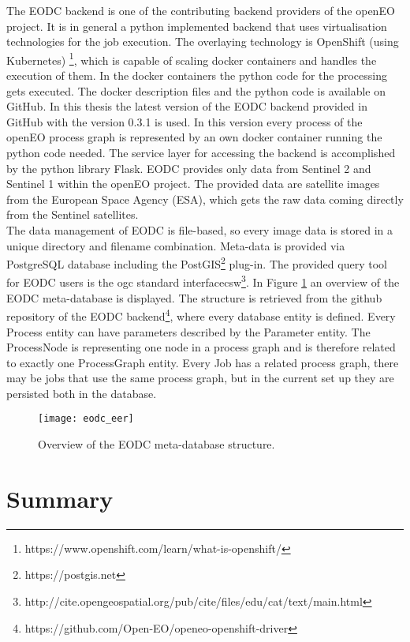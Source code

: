 \documentclass[draft,final]{vutinfth} %
\begin{document}
The EODC backend is one of the contributing backend providers of the openEO project. It is in general a python implemented backend that uses virtualisation technologies for the job execution. The overlaying technology is OpenShift (using Kubernetes) \footnote{https://www.openshift.com/learn/what-is-openshift/}, which is capable of scaling docker containers and handles the execution of them. In the docker containers the python code for the processing gets executed. The docker description files and the python code is available on GitHub. In this thesis the latest version of the EODC backend provided in GitHub with the version 0.3.1 is used. In this version every process of the openEO process graph is represented by an own docker container running the python code needed. The service layer for accessing the backend is accomplished by the python library Flask. EODC provides only data from Sentinel 2 and Sentinel 1 within the openEO project. The provided data are satellite images from the European Space Agency (ESA), which gets the raw data coming directly from the Sentinel satellites. \\
The data management of EODC is file-based, so every image data is stored in a unique directory and filename combination. Meta-data is provided via PostgreSQL database including the PostGIS\footnote{https://postgis.net} plug-in. The provided query tool for EODC users is the \gls{ogc} standard interface\gls{csw}\footnote{http://cite.opengeospatial.org/pub/cite/files/edu/cat/text/main.html}. In Figure \ref{fig:eodceer} an overview of the EODC meta-database is displayed. The structure is retrieved from the github repository of the EODC backend\footnote{https://github.com/Open-EO/openeo-openshift-driver}, where every database entity is defined. Every Process entity can have parameters described by the Parameter entity. The ProcessNode is representing one node in a process graph and is therefore related to exactly one ProcessGraph entity. Every Job has a related process graph, there may be jobs that use the same process graph, but in the current set up they are persisted both in the database.

\begin{figure}[h]
	\centering
	\texttt{[image: eodc\_eer]}
	\caption{Overview of the EODC meta-database structure.}
	\label{fig:eodceer} %
\end{figure}

\section{Summary}
\end{document}
